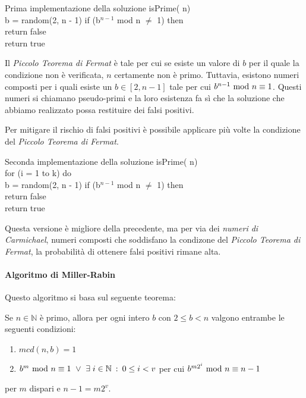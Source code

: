 \begin{minicode}{Prima implementazione della soluzione}
\ind{} isPrime( n)\\
     b = random(2, n - 1)\hfill{}
    \indf if (b$^{n - 1}$ mod n $\neq$ 1) then\\
        return false\\
    \indf return true
\end{minicode}

\noindent
Il \emph{Piccolo Teorema di Fermat} è tale per cui se esiste un valore di $b$
per il quale la condizione non è verificata, $n$ certamente non è primo.
Tuttavia, esistono numeri composti per i quali esiste un $b\in[2,n-1]$ tale
per cui $b^{n-1}\ \mathrm{mod}\ n\equiv 1$. Questi numeri si chiamano pseudo-primi e
la loro esistenza fa sì che la soluzione che abbiamo realizzato possa
restituire dei falsi positivi.

Per mitigare il rischio di falsi positivi è possibile applicare più volte
la condizione del \emph{Piccolo Teorema di Fermat}.

\begin{minicode}{Seconda implementazione della soluzione}
\ind{} isPrime( n)\\
    \indf for (i = 1 to k) do\\
         b = random(2, n - 1)\hfill{}
        \indff if (b$^{n - 1}$ mod n $\neq$ 1) then\\
            return false\\
    \indf return true
\end{minicode}

\noindent
Questa versione è migliore della precedente, ma per via dei \emph{numeri di
Carmichael}, numeri composti che soddisfano la condizone del
\emph{Piccolo Teorema di Fermat}, la probabilità di ottenere falsi positivi
rimane alta.

\paragraph{Algoritmo di Miller-Rabin}
Questo algoritmo si basa sul seguente teorema:
\begin{definition}
    Se $n\in\mathbb{N}$ è primo, allora per ogni intero $b$ con $2\leq b<n$
    valgono entrambe le seguenti condizioni:
    \begin{enumerate}
        \item $mcd(n,b)=1$
        \item $b^m\ \mathrm{mod}\ n\equiv 1\ \vee\ \exists\; i\in\mathbb{N}\::\:0\leq
        i<v$ per cui $b^{m2^i}\ \mathrm{mod}\ n\equiv n-1$
    \end{enumerate}
    per $m$ dispari e $n-1=m2^v$.
\end{definition}

